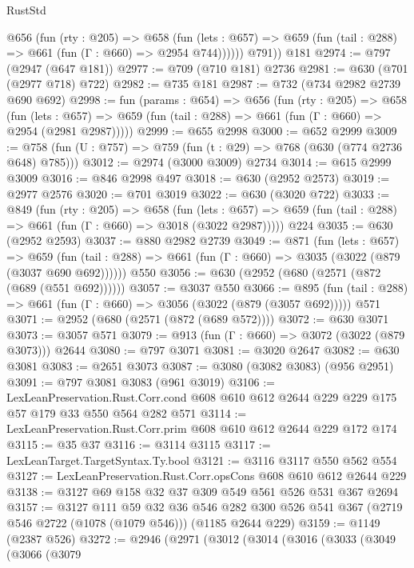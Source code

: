 \begin{lexlean}{RustStd}
\begin{coremodule}
{\begin{coremodule}
{{{{{{{{{{          @656
            (fun (rty : @205) =>
            @658
              (fun (lets : @657) =>
              @659 (fun (tail : @288) => @661 (fun (Γ : @660) => @2954 @744))))))
        @791))
    @181
@2974 := @797 (@2947 (@647 @181))
@2977 := @709 (@710 @181) @2736
@2981 := @630 (@701 (@2977 @718) @722)
@2982 := @735 @181
@2987 := @732 (@734 @2982 @2739 @690 @692)
@2998 := fun (params : @654) =>
  @656
    (fun (rty : @205) =>
    @658
      (fun (lets : @657) =>
      @659 (fun (tail : @288) => @661 (fun (Γ : @660) => @2954 (@2981 @2987)))))
@2999 := @655 @2998
@3000 := @652 @2999
@3009 := @758 (fun (U : @757) => @759 (fun (t : @29) => @768 (@630 (@774 @2736 @648) @785)))
@3012 := @2974 (@3000 @3009) @2734
@3014 := @615 @2999 @3009
@3016 := @846 @2998 @497
@3018 := @630 (@2952 @2573)
@3019 := @2977 @2576
@3020 := @701 @3019
@3022 := @630 (@3020 @722)
@3033 := @849
    (fun (rty : @205) =>
    @658
      (fun (lets : @657) =>
      @659 (fun (tail : @288) => @661 (fun (Γ : @660) => @3018 (@3022 @2987)))))
    @224
@3035 := @630 (@2952 @2593)
@3037 := @880 @2982 @2739
@3049 := @871
    (fun (lets : @657) =>
    @659 (fun (tail : @288) => @661 (fun (Γ : @660) => @3035 (@3022 (@879 (@3037 @690 @692))))))
    @550
@3056 := @630 (@2952 (@680 (@2571 (@872 (@689 (@551 @692))))))
@3057 := @3037 @550
@3066 := @895 (fun (tail : @288) => @661 (fun (Γ : @660) => @3056 (@3022 (@879 (@3057 @692))))) @571
@3071 := @2952 (@680 (@2571 (@872 (@689 @572))))
@3072 := @630 @3071
@3073 := @3057 @571
@3079 := @913 (fun (Γ : @660) => @3072 (@3022 (@879 @3073))) @2644
@3080 := @797 @3071
@3081 := @3020 @2647
@3082 := @630 @3081
@3083 := @2651 @3073
@3087 := @3080 (@3082 @3083) (@956 @2951)
@3091 := @797 @3081 @3083 (@961 @3019)
@3106 := LexLeanPreservation.Rust.Corr.cond
    @608
    @610
    @612
    @2644
    @229
    @229
    @175
    @57
    @179
    @33
    @550
    @564
    @282
    @571
@3114 := LexLeanPreservation.Rust.Corr.prim @608 @610 @612 @2644 @229 @172 @174
@3115 := @35 @37
@3116 := @3114 @3115
@3117 := LexLeanTarget.TargetSyntax.Ty.bool
@3121 := @3116 @3117 @550 @562 @554
@3127 := LexLeanPreservation.Rust.Corr.opsCons @608 @610 @612 @2644 @229
@3138 := @3127 @69 @158 @32 @37 @309 @549 @561 @526 @531 @367 @2694
@3157 := @3127
    @111
    @59
    @32
    @36
    @546
    @282
    @300
    @526
    @541
    @367
    (@2719 @546 @2722 (@1078 (@1079 @546)))
    (@1185 @2644 @229)
@3159 := @1149 (@2387 @526)
@3272 := @2946
    (@2971
      (@3012
        (@3014
          (@3016
            (@3033
              (@3049
                (@3066
                  (@3079
}}}}}}}}}}
\end{coremodule}}
\end{coremodule}
\end{lexlean}
